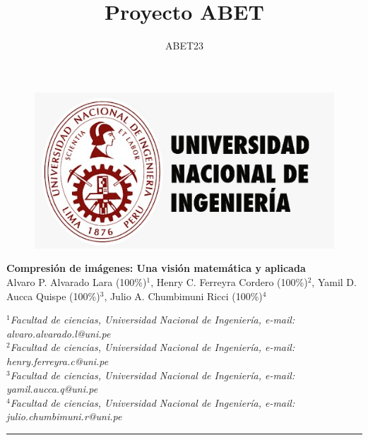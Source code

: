 \documentclass[8pt,a4paper]{article}
\author{ABET23}
\title{Proyecto ABET}
\theoremstyle{definition}
\theoremstyle{remark}
\begin{document}
	\begin{figure}[H]
		\raggedright
		\hfill \includegraphics[scale=0.20]{escudouni.png}
	\end{figure}

	\vspace{7.5mm}
	
	\begin{center}
		{\Large \textbf{Compresión de imágenes: Una visión matemática y aplicada}}\\
		\vspace{2mm}
		{\large Alvaro P. Alvarado Lara (100\%)$^{1}$, Henry C. Ferreyra Cordero (100\%)$^{2}$, Yamil D. Aucca Quispe (100\%)$^{3}$, Julio A. Chumbimuni Ricci (100\%)$^{4}$ }\\
		\vspace{7.5mm}
		
		$^1$\textit{Facultad de ciencias, Universidad Nacional de Ingenier\'ia, e-mail: alvaro.alvarado.l@uni.pe} \\
		$^2$\textit{Facultad de ciencias, Universidad Nacional de Ingenier\'ia, e-mail: henry.ferreyra.c@uni.pe} \\
		$^3$\textit{Facultad de ciencias, Universidad Nacional de Ingenier\'ia, e-mail: yamil.aucca.q@uni.pe} \\
		$^4$\textit{Facultad de ciencias, Universidad Nacional de Ingenier\'ia, e-mail: julio.chumbimuni.r@uni.pe} \\
	\end{center}


	\begin{center}
		\textcolor{azul}{\rule{150mm}{0.5mm}}
	\end{center}		
\end{document}
